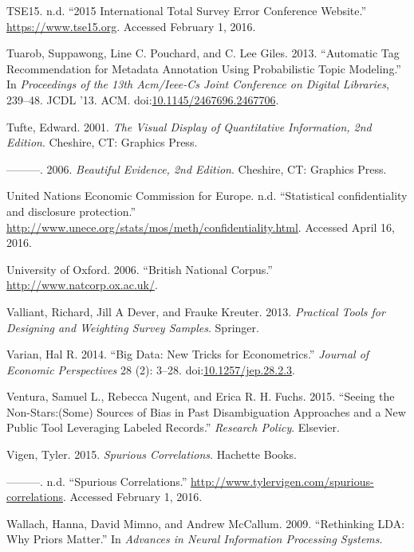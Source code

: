 \documentclass[]{krantz}
\begin{document}
\hypertarget{ref-TSEweb}{}
TSE15. n.d. ``2015 International Total Survey Error Conference
Website.'' \url{https://www.tse15.org}. Accessed February 1, 2016.

\hypertarget{ref-tuarob-13}{}
Tuarob, Suppawong, Line C. Pouchard, and C. Lee Giles. 2013. ``Automatic
Tag Recommendation for Metadata Annotation Using Probabilistic Topic
Modeling.'' In \emph{Proceedings of the 13th Acm/Ieee-Cs Joint
Conference on Digital Libraries}, 239--48. JCDL '13. ACM.
doi:\href{https://doi.org/10.1145/2467696.2467706}{10.1145/2467696.2467706}.

\hypertarget{ref-edward2001visual}{}
Tufte, Edward. 2001. \emph{The Visual Display of Quantitative
Information, 2nd Edition}. Cheshire, CT: Graphics Press.

\hypertarget{ref-edward2006beauty}{}
---------. 2006. \emph{Beautiful Evidence, 2nd Edition}. Cheshire, CT:
Graphics Press.

\hypertarget{ref-UnitedNationsEconomicCommissionforEurope}{}
United Nations Economic Commission for Europe. n.d. ``Statistical
confidentiality and disclosure protection.''
\url{http://www.unece.org/stats/mos/meth/confidentiality.html}. Accessed
April 16, 2016.

\hypertarget{ref-bnc}{}
University of Oxford. 2006. ``British National Corpus.''
\url{http://www.natcorp.ox.ac.uk/}.

\hypertarget{ref-valliant2013practical}{}
Valliant, Richard, Jill A Dever, and Frauke Kreuter. 2013.
\emph{Practical Tools for Designing and Weighting Survey Samples}.
Springer.

\hypertarget{ref-Varian2014}{}
Varian, Hal R. 2014. ``Big Data: New Tricks for Econometrics.''
\emph{Journal of Economic Perspectives} 28 (2): 3--28.
doi:\href{https://doi.org/10.1257/jep.28.2.3}{10.1257/jep.28.2.3}.

\hypertarget{ref-ventura2015seeing}{}
Ventura, Samuel L., Rebecca Nugent, and Erica R. H. Fuchs. 2015.
``Seeing the Non-Stars:(Some) Sources of Bias in Past Disambiguation
Approaches and a New Public Tool Leveraging Labeled Records.''
\emph{Research Policy}. Elsevier.

\hypertarget{ref-spurious2}{}
Vigen, Tyler. 2015. \emph{Spurious Correlations}. Hachette Books.

\hypertarget{ref-spurious}{}
---------. n.d. ``Spurious Correlations.''
\url{http://www.tylervigen.com/spurious-correlations}. Accessed February
1, 2016.

\hypertarget{ref-wallach-09b}{}
Wallach, Hanna, David Mimno, and Andrew McCallum. 2009. ``Rethinking
LDA: Why Priors Matter.'' In \emph{Advances in Neural Information
Processing Systems}.
\end{document}
